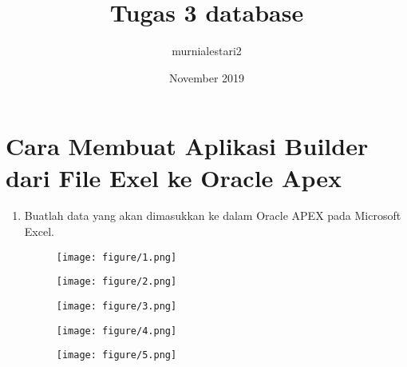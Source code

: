 \documentclass{article}
\title{Tugas 3 database}
\author{murnialestari2 }
\date{November 2019}
\begin{document}
\maketitle

\section{Cara Membuat Aplikasi Builder dari File Exel ke Oracle Apex}
\begin{enumerate}
\item Buatlah data yang akan dimasukkan ke dalam Oracle APEX pada Microsoft Excel.
\begin{figure} [h]
\centerline{\texttt{[image: figure/1.png]}}
\end{figure}
\begin{figure}[h]
\centerline{\texttt{[image: figure/2.png]}}
\end{figure}
\begin{figure}[h]
\centerline{\texttt{[image: figure/3.png]}}
\end{figure}
\begin{figure}[h]
\centerline{\texttt{[image: figure/4.png]}}
\end{figure}
\newpage \begin{figure}[h]
\centerline{\texttt{[image: figure/5.png]}}
\end{figure}


\end{enumerate}
\end{document}
